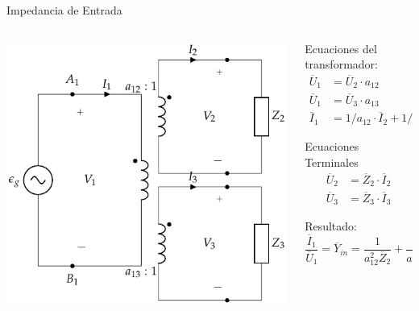 \documentclass[xcolor={usenames,svgnames,dvipsnames}]{beamer}
\begin{document}
\begin{frame}[label={sec:org66ddb48}]{Impedancia de Entrada}
\begin{columns}
\begin{column}{0.4\columnwidth}
\begin{center}
\includegraphics[width=.9\linewidth]{../figs/TrafoIdealVariosDevanados_Impedancia.pdf}
\end{center}
\end{column}

\begin{column}{0.6\columnwidth}
Ecuaciones del transformador:
\begin{align*}
  \overline{U}_1 &= \overline{U}_2 \cdot a_{12}\\
  \overline{U}_1 &= \overline{U}_3 \cdot a_{13}\\
  \overline{I}_1 &= 1/a_{12} \cdot \overline{I}_2 + 1/a_{13} \cdot  \overline{I}_3
\end{align*}

Ecuaciones Terminales
\begin{align*}
  \overline{U}_2 &= \overline{Z}_2 \cdot \overline{I}_2\\
  \overline{U}_3 &= \overline{Z}_3 \cdot \overline{I}_3
\end{align*}

Resultado:
\[
  \frac{\overline{I}_1}{\overline{U}_1} = \boxed{\overline{Y}_{in} = \frac{1}{a^2_{12} \overline{Z}_2} +  \frac{1}{a^2_{13} \overline{Z}_3}}
\]
\end{column}
\end{columns}
\end{frame}
\end{document}
